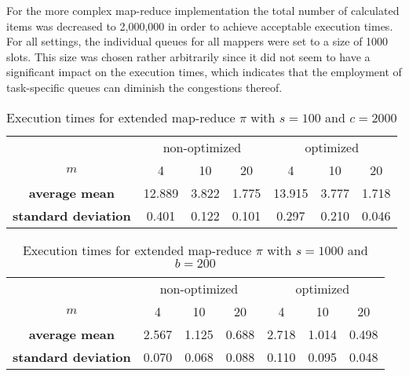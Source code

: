For the more complex map-reduce implementation the total number of calculated items was decreased to 2,000,000 in order to achieve acceptable execution times. For all settings, the individual queues for all mappers were set to a size of 1000 slots. This size was chosen rather arbitrarily since it did not seem to have a significant impact on the execution times, which indicates that the employment of task-specific queues can diminish the congestions thereof.
\begin{table}[h!]
\begin{center}
\begin{tabular}{c |c|c|c||c|c|c|}
  \multicolumn{1}{c}{} & \multicolumn{3}{c}{non-optimized} & \multicolumn{3}{c}{optimized}\\ \cline{2-7}
  $m$ & 4 & 10 & 20 & 4 & 10 & 20\\ \cline{2-7}
  \textbf{average mean} & 12.889 & 3.822 & 1.775 & 13.915 & 3.777 & 1.718	\\ \cline{2-7}
  \textbf{standard deviation} & 0.401 & 0.122 & 0.101 & 0.297 & 0.210 & 0.046\\ \cline{2-7}
\end{tabular}
\caption{Execution times for extended map-reduce $\pi$ with $s = 100$ and $c = 2000$}
\label{table:extended_pi_100}
\end{center}
\end{table}

\begin{table}[h!]
\begin{center}
\begin{tabular}{c |c|c|c||c|c|c|}
  \multicolumn{1}{c}{} & \multicolumn{3}{c}{non-optimized} & \multicolumn{3}{c}{optimized}\\ \cline{2-7}
  $m$ & 4 & 10 & 20 & 4 & 10 & 20\\ \cline{2-7}
  \textbf{average mean} & 2.567 & 1.125 & 0.688 & 2.718 & 1.014 & 0.498	\\ \cline{2-7}
  \textbf{standard deviation} & 0.070 & 0.068 & 0.088 & 0.110 & 0.095 & 0.048\\ \cline{2-7}
\end{tabular}
\caption{Execution times for extended map-reduce $\pi$ with $s = 1000$ and $b = 200$}
\label{table:extended_pi_1000}
\end{center}
\end{table}

